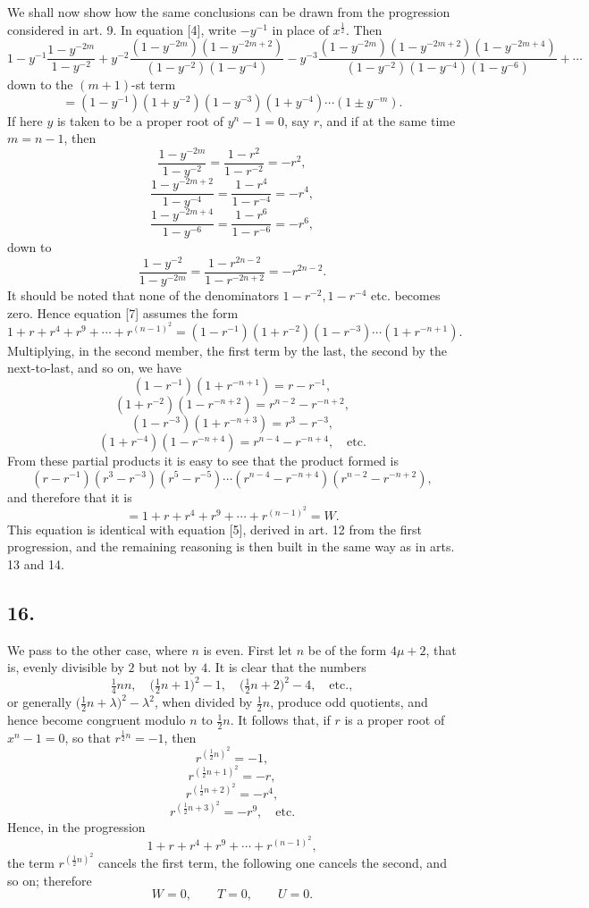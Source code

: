 \documentclass[12pt]{article}
\begin{document}
We shall now show how the same conclusions can be drawn from the progression considered in art. 9. In equation [4], write $-y^{-1}$ in place of $x^{\frac12}$. Then
\[
1-y^{-1}\frac{1-y^{-2m}}{1-y^{-2}}
+y^{-2}\frac{(1-y^{-2m})(1-y^{-2m+2})}{(1-y^{-2})(1-y^{-4})}
-y^{-3}\frac{(1-y^{-2m})(1-y^{-2m+2})(1-y^{-2m+4})}{(1-y^{-2})(1-y^{-4})(1-y^{-6})}
+\cdots
\]
down to the $(m+1)$-st term
\[
=(1-y^{-1})(1+y^{-2})(1-y^{-3})(1+y^{-4})\cdots(1\pm y^{-m}). \tag{7}
\]
If here $y$ is taken to be a proper root of $y^n-1=0$, say $r$, and if at the same time $m=n-1$, then
\[
\frac{1-y^{-2m}}{1-y^{-2}}=\frac{1-r^2}{1-r^{-2}}=-r^2,
\]
\[
\frac{1-y^{-2m+2}}{1-y^{-4}}=\frac{1-r^4}{1-r^{-4}}=-r^4,
\]
\[
\frac{1-y^{-2m+4}}{1-y^{-6}}=\frac{1-r^6}{1-r^{-6}}=-r^6,
\]
down to
\[
\frac{1-y^{-2}}{1-y^{-2m}}=\frac{1-r^{2n-2}}{1-r^{-2n+2}}=-r^{2n-2}.
\]
It should be noted that none of the denominators $1-r^{-2},1-r^{-4}$ etc. becomes zero. Hence equation [7] assumes the form
\[
1+r+r^4+r^9+\cdots+r^{(n-1)^2}
=(1-r^{-1})(1+r^{-2})(1-r^{-3})\cdots(1+r^{-n+1}).
\]
Multiplying, in the second member, the first term by the last, the second by the next-to-last, and so on, we have
\[
(1-r^{-1})(1+r^{-n+1})=r-r^{-1},
\]
\[
(1+r^{-2})(1-r^{-n+2})=r^{n-2}-r^{-n+2},
\]
\[
(1-r^{-3})(1+r^{-n+3})=r^3-r^{-3},
\]
\[
(1+r^{-4})(1-r^{-n+4})=r^{n-4}-r^{-n+4},\quad\text{etc.}
\]
From these partial products it is easy to see that the product formed is
\[
(r-r^{-1})(r^3-r^{-3})(r^5-r^{-5})\cdots(r^{n-4}-r^{-n+4})(r^{n-2}-r^{-n+2}),
\]
and therefore that it is
\[
=1+r+r^4+r^9+\cdots+r^{(n-1)^2}=W.
\]
This equation is identical with equation [5], derived in art. 12 from the first progression, and the remaining reasoning is then built in the same way as in arts. 13 and 14.

\subsection*{16.}

We pass to the other case, where $n$ is even. First let $n$ be of the form $4\mu+2$, that is, evenly divisible by $2$ but not by $4$. It is clear that the numbers
\[
\tfrac14 nn,\quad \bigl(\tfrac12 n+1\bigr)^2-1,\quad \bigl(\tfrac12 n+2\bigr)^2-4,\quad\text{etc.},
\]
or generally $\bigl(\tfrac12 n+\lambda\bigr)^2-\lambda^2$, when divided by $\tfrac12 n$, produce odd quotients, and hence become congruent modulo $n$ to $\tfrac12 n$. It follows that, if $r$ is a proper root of $x^n-1=0$, so that $r^{\frac12 n}=-1$, then
\[
r^{(\frac12 n)^2}=-1,
\]
\[
r^{(\frac12 n+1)^2}=-r,
\]
\[
r^{(\frac12 n+2)^2}=-r^4,
\]
\[
r^{(\frac12 n+3)^2}=-r^9,\quad\text{etc.}
\]
Hence, in the progression
\[
1+r+r^4+r^9+\cdots+r^{(n-1)^2},
\]
the term $r^{(\frac12 n)^2}$ cancels the first term, the following one cancels the second, and so on; therefore
\[
W=0,\qquad T=0,\qquad U=0.
\]
\end{document}
